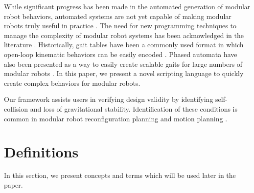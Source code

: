 \documentclass[conference]{IEEEtran}
\theoremstyle{definition}
\begin{document}
While significant progress has been made in the automated generation of modular robot behaviors,
automated systems are not yet capable of making modular robots truly useful in practice
\cite{yim2007modular}.  The need for new programming techniques to manage the complexity
of modular robot systems has been acknowledged in the literature \cite{yim2000modular}.
Historically, gait tables have been a commonly used format in which open-loop kinematic
behaviors can be easily encoded \cite{yim1994locomotion}. Phased automata have also
been presented as a way to easily create scalable gaits for large numbers of modular
robots \cite{zhang2003phase}. In this paper, we present a novel scripting language
to quickly create complex behaviors for modular robots.

Our framework assists users in verifying design validity by identifying self-collision
and loss of gravitational stability. Identification of these conditions is common
in modular robot reconfiguration planning \cite{casal2001reconfiguration} and motion
planning \cite{yoshida2002self}.

\section{Definitions}
\label{sec:preliminaries}
In this section, we present concepts and terms which will be used later in the paper.
\end{document}
